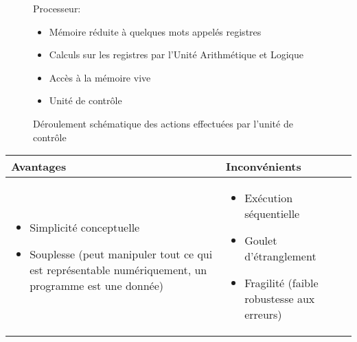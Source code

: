 \begin{figure}[!htb]
\begin{minipage}{0.6\textwidth}
Processeur:
\begin{itemize}
\item Mémoire réduite à quelques mots appelés registres
\item Calculs sur les registres par l'Unité Arithmétique et Logique
\item Accès à la mémoire vive
\item Unité de contrôle
\end{itemize}

\end{minipage}
\begin{minipage}{0.4\textwidth}
\begin{center}
\caption{Déroulement schématique des actions effectuées par l'unité de contrôle}
\end{center}
\end{minipage}
\end{figure}

\begin{center}
\begin{tabular}{p{}|p{}}
\textbf{Avantages}
&
\textbf{Inconvénients}\\
\hline
\begin{itemize}
\item Simplicité conceptuelle
\item Souplesse (peut manipuler tout ce qui est représentable
  numériquement, un programme est une donnée)
\end{itemize}
&
\begin{itemize}
\item Exécution séquentielle
\item Goulet d'étranglement
\item Fragilité (faible robustesse aux erreurs)
\end{itemize}
\end{tabular}
\end{center}



